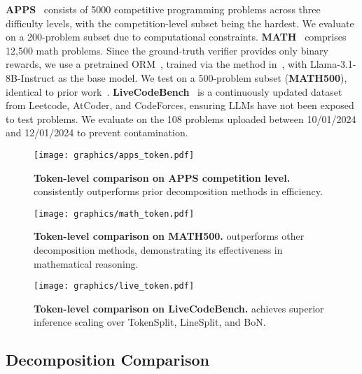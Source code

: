 \textbf{APPS}~\citep{hendrycks2021measuring} consists of 5000 competitive programming problems across three difficulty levels, with the competition-level subset being the hardest. We evaluate on a 200-problem subset due to computational constraints.
\textbf{MATH}~\citep{hendrycks2021measuring-MATH} comprises 12,500 math problems. Since the ground-truth verifier provides only binary rewards, we use a pretrained ORM~\citep{xiong2024rlhflowmath}, trained via the method in~\citep{wang2024math}, with Llama-3.1-8B-Instruct as the base model. We test on a 500-problem subset (\textbf{MATH500}), identical to prior work~\citep{wang2024math, lightman2023let}.
\textbf{LiveCodeBench}~\citep{jain2024livecodebench} is a continuously updated dataset from Leetcode, AtCoder, and CodeForces, ensuring LLMs have not been exposed to test problems. We evaluate on the 108 problems uploaded between 10/01/2024 and 12/01/2024 to prevent contamination.
\begin{figure}[ht]
\vspace{-0.3cm}
    \centering
    \texttt{[image: graphics/apps\_token.pdf]}
   \vspace{-0.3cm}
    \caption{\textbf{Token-level comparison on APPS competition level.} \decomp consistently outperforms prior decomposition methods in efficiency.}
    \label{fig:apps_token}
\vskip -0.1in
\end{figure}

\begin{figure}[ht]
\vspace{-0.2cm}
    \centering
    \texttt{[image: graphics/math\_token.pdf]}
 \vspace{-0.3cm}
    \caption{\textbf{Token-level comparison on MATH500.} \decomp outperforms other decomposition methods, demonstrating its effectiveness in mathematical reasoning.}
    \label{fig:math_token}
\vskip -0.1in
\end{figure}

\begin{figure}[ht]
    \centering
    \vspace{-0.3cm}\texttt{[image: graphics/live\_token.pdf]}\vspace{-0.3cm}
    \caption{\textbf{Token-level comparison on LiveCodeBench.} \decomp achieves superior inference scaling over TokenSplit, LineSplit, and BoN.}
    \label{fig:live_token}\vspace{-0.3cm}
\end{figure}
\subsection{Decomposition Comparison}
\label{sec:scaling_methods}

